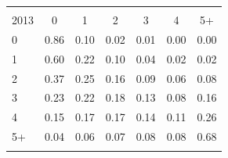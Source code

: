 \begin{tabular}{lcccccc}
\hline \noalign{\smallskip}\multicolumn{7}{c}{2014}\\
2013 & 0 & 1 & 2 & 3 & 4 & 5+\\
\noalign{\smallskip}\hline \noalign{\smallskip}0 & 0.86 & 0.10 & 0.02 & 0.01 & 0.00 & 0.00\\
1 & 0.60 & 0.22 & 0.10 & 0.04 & 0.02 & 0.02\\
2 & 0.37 & 0.25 & 0.16 & 0.09 & 0.06 & 0.08\\
3 & 0.23 & 0.22 & 0.18 & 0.13 & 0.08 & 0.16\\
4 & 0.15 & 0.17 & 0.17 & 0.14 & 0.11 & 0.26\\
5+ & 0.04 & 0.06 & 0.07 & 0.08 & 0.08 & 0.68\\
\noalign{\smallskip}\hline\end{tabular}
